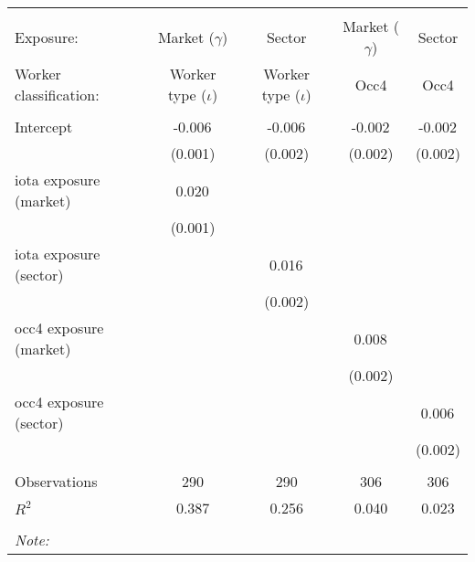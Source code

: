 \begin{tabular}{@{\extracolsep{5pt}}lcccc}
\\[-1.8ex]\hline
\hline \\[-1.8ex]
\hline \\[-1.8ex]
 Exposure: & Market ($\gamma$) & Sector & Market ($\gamma$) & Sector \\
 Worker classification: & Worker type ($\iota$) & Worker type ($\iota$) & Occ4 & Occ4 \\
 \hline &  &  &  &  \\
 Intercept & -0.006$^{}$ & -0.006$^{}$ & -0.002$^{}$ & -0.002$^{}$ \\
  & (0.001) & (0.002) & (0.002) & (0.002) \\
 iota exposure (market) & 0.020$^{}$ & & & \\
  & (0.001) & & & \\
 iota exposure (sector) & & 0.016$^{}$ & & \\
  & & (0.002) & & \\
 occ4 exposure (market) & & & 0.008$^{}$ & \\
  & & & (0.002) & \\
 occ4 exposure (sector) & & & & 0.006$^{}$ \\
  & & & & (0.002) \\
\hline \\[-1.8ex]
 Observations & 290 & 290 & 306 & 306 \\
 $R^2$ & 0.387 & 0.256 & 0.040 & 0.023 \\
\hline
\hline \\[-1.8ex]
\textit{Note:}\end{tabular}